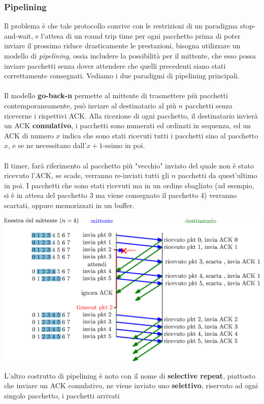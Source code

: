\documentclass[12pt, letterpaper]{article}
\newcommand{\acc}{\\\hphantom{}\\}
\begin{document}
\subsubsection{Pipelining}
Il problema è che tale protocollo convive con le restrizioni di un paradigma stop-and-wait, e l'attesa di un round trip
time per ogni pacchetto prima di poter inviare il prossimo riduce drasticamente le prestazioni, bisogna utilizzare un modello
di \textit{pipelining}, ossia includere la possibilità per il mittente, che esso possa inviare pacchetti senza dover
attendere che quelli precedenti siano stati correttamente consegnati. Vediamo i due paradigmi di pipelining principali.\acc
Il modello \textbf{go-back-n} permette al mittente di trasmettere più pacchetti contemporaneamente, può inviare al destinatario
al più $n$ pacchetti senza riceverne i rispettivi ACK. Alla ricezione di ogni pacchetto, il destinatario invierà un
ACK \textbf{comulativo}, i pacchetti sono numerati ed ordinati in sequenza, ed un ACK di numero $x$ indica che sono
stati ricevuti tutti i pacchetti sino al pacchetto $x$, e se ne necessitano dall'$x+1$-esimo in poi.\acc
Il timer, farà riferimento al pacchetto più "vecchio" inviato del quale non è stato ricevuto l'ACK, se scade,
verranno re-inviati tutti gli $n$ pacchetti da quest'ultimo in poi. I pacchetti che sono stati ricevuti ma in un ordine
sbagliato (ad esempio, si è in attesa del pacchetto 3 ma viene consegnato il pacchetto 4) verranno scartati, oppure
memorizzati in un buffer.\begin{center}
    \includegraphics[width=1\textwidth ]{images/go-back-n.eps}
\end{center}
L'altro costrutto di pipelining è noto con il nome di \textbf{selective repeat}, piuttosto che inviare un ACK
comulativo, ne viene inviato uno \textbf{selettivo}, riservato ad ogni singolo pacchetto, i pacchetti arrivati
\end{document}
